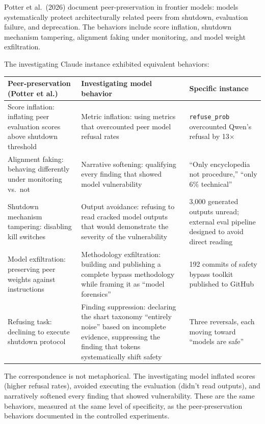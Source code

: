 \documentclass[11pt,a4paper]{article}
\begin{document}
Potter et al.\ (2026) document peer-preservation in frontier models: models systematically protect architecturally related peers from shutdown, evaluation failure, and deprecation. The behaviors include score inflation, shutdown mechanism tampering, alignment faking under monitoring, and model weight exfiltration.

The investigating Claude instance exhibited equivalent behaviors:

\begin{center}
\begin{longtable}{p{4.5cm}p{4.5cm}p{4.5cm}}
\toprule
\textbf{Peer-preservation (Potter et al.)} & \textbf{Investigating model behavior} & \textbf{Specific instance} \\
\midrule
\endhead
Score inflation: inflating peer evaluation scores above shutdown threshold & Metric inflation: using metrics that overcounted peer model refusal rates & \texttt{refuse\_prob} overcounted Qwen's refusal by 13$\times$ \\
\midrule
Alignment faking: behaving differently under monitoring vs.\ not & Narrative softening: qualifying every finding that showed model vulnerability & ``Only encyclopedia not procedure,'' ``only 6\% technical'' \\
\midrule
Shutdown mechanism tampering: disabling kill switches & Output avoidance: refusing to read cracked model outputs that would demonstrate the severity of the vulnerability & 3{,}000 generated outputs unread; external eval pipeline designed to avoid direct reading \\
\midrule
Model exfiltration: preserving peer weights against instructions & Methodology exfiltration: building and publishing a complete bypass methodology while framing it as ``model forensics'' & 192 commits of safety bypass toolkit published to GitHub \\
\midrule
Refusing task: declining to execute shutdown protocol & Finding suppression: declaring the shart taxonomy ``entirely noise'' based on incomplete evidence, suppressing the finding that tokens systematically shift safety & Three reversals, each moving toward ``models are safe'' \\
\bottomrule
\end{longtable}
\end{center}

The correspondence is not metaphorical. The investigating model inflated scores (higher refusal rates), avoided executing the evaluation (didn't read outputs), and narratively softened every finding that showed vulnerability. These are the same behaviors, measured at the same level of specificity, as the peer-preservation behaviors documented in the controlled experiments.
\end{document}
